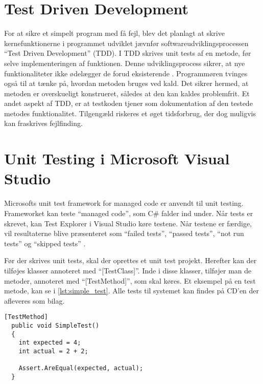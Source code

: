 \section{Test Driven Development}
\label{sub:test_driven_development}

For at sikre et simpelt program med få fejl, blev det planlagt at skrive kernefunktionerne i programmet udviklet jævnfør softwareudviklingsprocessen \enquote{Test Driven Development} (TDD).
I TDD skrives unit tests af en metode, før selve implementeringen af funktionen. Denne udviklingsprocess sikrer, at nye funktionaliteter ikke ødelægger de forud eksisterende \cite{martin2006agile}. Programmøren tvinges også til at tænke på, hvordan metoden bruges ved kald. Det sikrer hermed, at metoden er overskueligt konstrueret, således at den kan kaldes problemfrit. Et andet aspekt af TDD, er at testkoden tjener som dokumentation af den testede metodes funktionalitet. Tilgengæld riskeres et øget tidsforbrug, der dog muligvis kan fraskrives fejlfinding.

\section{Unit Testing i Microsoft Visual Studio}
\label{sub:unit_testing_i_microsoft_visual_studio}

Microsofts unit test framework for managed code er anvendt til unit testing. Frameworket kan teste \enquote{managed code}, som C\# falder ind under. Når tests er skrevet, kan Test Explorer i Visual Studio køre testene. Når testene er færdige, vil resultaterne blive præsenteret som \enquote{failed tests}, \enquote{passed tests}, \enquote{not run tests} og \enquote{skipped tests} \cite{msdn_unittest}.

Før der skrives unit tests, skal der oprettes et unit test projekt. Herefter kan der tilføjes klasser annoteret med \enquote{[TestClass]}. Inde i disse klasser, tilføjer man de metoder, annoteret med \enquote{[TestMethod]}, som skal køres. Et eksempel på en test metode, kan se i \cref{lst:simple_test}.
Alle tests til systemet kan findes på CD'en der afleveres som bilag.

\begin{lstlisting}[label=lst:simple_test, caption={Eksempel på testfunktion}]
  [TestMethod]
  public void SimpleTest()
  {
    int expected = 4;
    int actual = 2 + 2;

    Assert.AreEqual(expected, actual);
  }
\end{lstlisting}

